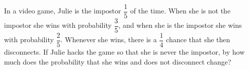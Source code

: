 In a video game, Julie is the impostor $\dfrac15$ of the time. When she is not the impostor she wins with probability $\dfrac35$, and when she is the impostor she wins with probability $\dfrac25$. Whenever she wins, there is a $\dfrac14$ chance that she then disconnects. If Julie hacks the game so that she is never the impostor, by how much does the probability that she wins and does not disconnect change?
